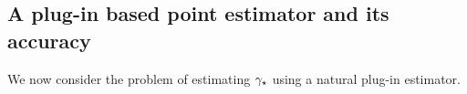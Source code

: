 
\subsection{A plug-in based point estimator and its accuracy}
\label{sec:rates-upper}
We now consider the problem of estimating $\gap$ using a natural
plug-in estimator.

\iffalse
Define the random matrix $\wh\vM \in [0,1]^{d \times d}$ and random
vector $\hat\vpi \in \Delta^{d-1}$ by
\begin{align*}
  \wh{M}_{i,j}
  & := \frac{|\{ t \in [n-1] : (X_t,X_{t+1}) = (i,j) \}|}{n-1}
  , \quad i,j \in [d]\,,
  \\
  \hat{\pi}_i
  & := \frac{|\{ t \in [n] : X_t = i \}|}{n}
  , \quad i \in [d]
  \,.
\end{align*}
Furthermore, define
\[
  \Sym(\wh\vL) := \frac12 \parens{ \wh\vL + \wh\vL^\t }
\]
to be the symmetrized version of the (possibly non-symmetric) matrix
\[
  \wh\vL := \Diag(\hat\vpi)^{-1/2} \wh\vM \Diag(\hat\vpi)^{-1/2}
  .
\]
Let $\hat\lambda_1 \geq \hat\lambda_2 \geq \dotsb \geq \hat\lambda_d$
be the eigenvalues of $\Sym(\wh\vL)$.
Our estimator of the minimum stationary probability $\pimin$ is
\[
  \hatpimin := \min_{i \in [d]} \hat\pi_i ,
\]
and our estimator of the spectral gap $\gap$ is
\[
  \hatgap := 1 - \max\{ \hat\lambda_2, |\hat\lambda_d| \} .
\]
These estimators have the following accuracy guarantees:
\fi
